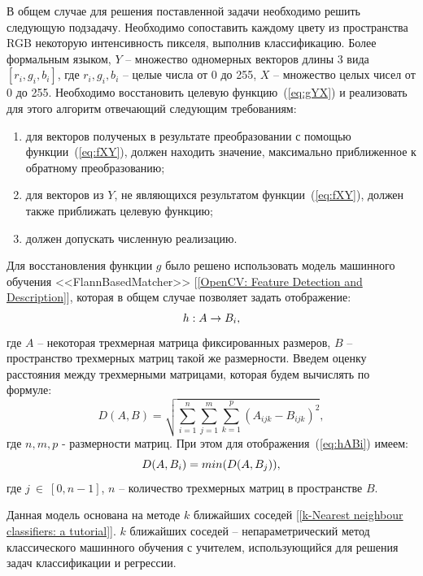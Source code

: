 \documentclass[14pt, a4paper]{extreport}
\begin{document}
	В общем случае для решения поставленной задачи необходимо решить следующую подзадачу. Необходимо сопоставить каждому цвету из пространства RGB некоторую интенсивность пикселя, выполнив классификацию. Более формальным языком, $Y$ -- множество одномерных векторов длины 3 вида $[r_i, g_i, b_i]$, где $r_i, g_i, b_i$ -- целые числа от 0 до 255, $X$ -- множество целых чисел от 0 до 255. Необходимо восстановить целевую функцию~(\ref{eq:gYX}) и реализовать для этого алгоритм отвечающий следующим требованиям:
	\begin{enumerate}[label={\arabic*)}]
		\item для векторов полученых в результате преобразовании с помощью функции~(\ref{eq:fXY}), должен находить значение, максимально приближенное к обратному преобразованию;
		\item для векторов из $Y$, не являющихся результатом функции~(\ref{eq:fXY}), должен также приближать целевую функцию;
		\item должен допускать численную реализацию.
	\end{enumerate}
	
	Для восстановления функции $g$ было решено использовать модель машинного обучения <<FlannBasedMatcher>> [\ref{OpenCV: Feature Detection and Description}], которая в общем случае позволяет задать отображение:
	\vspace*{-0.2cm}
	\begin{equation}
		h: A \rightarrow B_i,
		\label{eq:hABi}
		\vspace*{-0.4cm}
	\end{equation}
	где $A$ -- некоторая трехмерная матрица фиксированных размеров, $B$ -- пространство трехмерных матриц такой же размерности. Введем оценку расстояния между трехмерными матрицами, которая будем вычислять по формуле:
	\begin{equation*}
		D(A, B) = \sqrt{\sum\limits_{i=1}^n \sum\limits_{j=1}^m \sum\limits_{k=1}^p (A_{ijk} - B_{ijk})^2},
		\label{eq:D(A,B)}
	\end{equation*}
	где $n, m, p$ - размерности матриц. При этом для отображения~(\ref{eq:hABi}) имеем:
	\vspace*{-0.2cm}
	\begin{equation*}
		D(A, B_i) = min(D(A, B_j)), 
		\label{eq:D(A,B_i)}
		\vspace*{-0.4cm}
	\end{equation*}
	где $j~\in~[0, n-1]$, $n$ -- количество трехмерных матриц в пространстве $B$. 
	
	Данная модель основана на методе $k$ ближайших соседей [\ref{k-Nearest neighbour classifiers: a tutorial}]. $k$ ближайших соседей -- непараметрический метод классического машинного обучения с учителем, использующийся для решения задач классификации и регрессии. 
	
\end{document}
